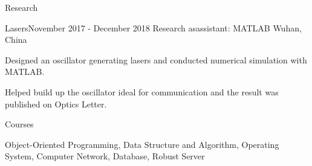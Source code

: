 \documentclass{resume} %
\begin{document}


\begin{rSection}{Research}

    \begin{rSubsection}{Lasers}{November 2017 - December 2018}
    {Research asassistant: MATLAB}
    {Wuhan, China}
    \item Designed an oscillator generating lasers and conducted numerical simulation with MATLAB.
    \item Helped build up the oscillator ideal for communication and the result was published on Optics Letter. 
    \end{rSubsection}
    
\end{rSection}


\begin{rSection}{Courses}

\item Object-Oriented Programming, Data Structure and Algorithm, Operating System, Computer Network, Database,
Robust Server

\end{rSection}



%
%
\end{document}
